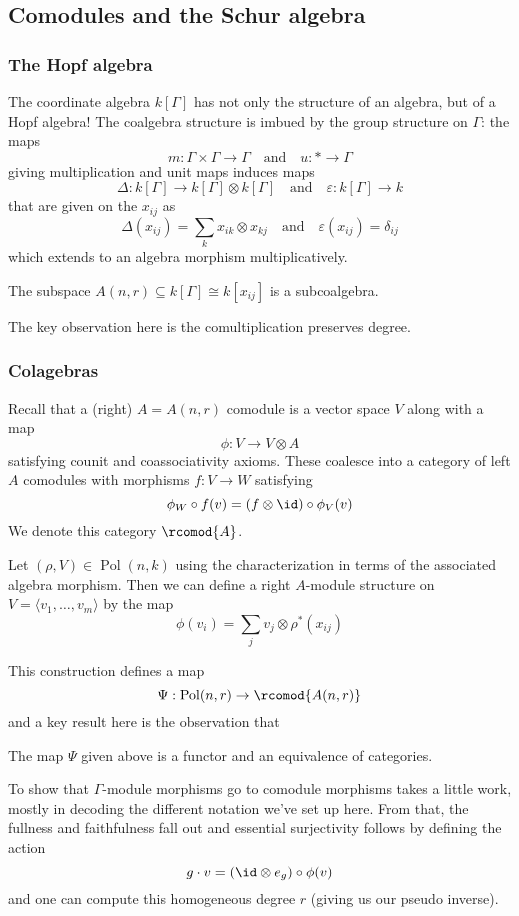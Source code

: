 \documentclass[12pt]{article}
\DeclareMathOperator{\Pol}{Pol}
\begin{document}
	\subsection{Comodules and the Schur algebra}
		\subsubsection{The Hopf algebra}
		The coordinate algebra $k[\Gamma]$ has not only the structure of an algebra, but of a Hopf algebra!
		The coalgebra structure is imbued by the group structure on $\Gamma$: the maps 
		\[m:\Gamma\times\Gamma\to \Gamma\quad\text{and}\quad u:\ast\to \Gamma\]
		giving multiplication and unit maps induces maps 
		\[\Delta:k[\Gamma]\to k[\Gamma]\otimes k[\Gamma]\quad\text{and}\quad \varepsilon:k[\Gamma]\to k\]
		that are given on the $x_{ij}$ as 
		\[\Delta(x_{ij})=\sum_k x_{ik}\otimes x_{kj}\quad\text{and}\quad \varepsilon(x_{ij})=\delta_{ij}\]
		which extends to an algebra morphism multiplicatively.

		\begin{thm}
			The subspace $A(n,r)\subseteq k[\Gamma]\cong k[x_{ij}]$ is a subcoalgebra.
		\end{thm}
		The key observation here is the comultiplication preserves degree.

		\subsubsection{Colagebras}
		Recall that a (right) $A=A(n,r)$ comodule is a vector space $V$ along with a map 
		\[\phi:V\to V\otimes A\]
		satisfying counit and coassociativity axioms. These coalesce into a category of left $A$ comodules with morphisms 
		$f:V\to W$ satisfying 
		\[\phi_W\circ f(v)=(f\otimes \id)\circ \phi_V(v)\]
		We denote this category $\rcomod{A}$.

		Let $(\rho,V)\in \Pol(n,k)$ using the characterization in terms of the associated algebra morphism. Then 
		we can define a right $A$-module structure on $V=\langle v_1,\dots,v_m\rangle$ by the map 
		\[\phi(v_i)=\sum_jv_j\otimes \rho^\ast(x_{ij})\] 
		
		This construction defines a map
		\[\Psi:\Pol(n,r)\to \rcomod{A(n,r)}\] 
		and a key result here is the observation that 
		\begin{thm}
			The map $\Psi$ given above is a functor and an equivalence of categories.
		\end{thm}
		\begin{rmk}
			To show that $\Gamma$-module morphisms go to comodule morphisms takes a little work, mostly in decoding 
			the different notation we've set up here. From that, the fullness and faithfulness fall out and essential surjectivity 
			follows by defining the action 
			\[g\cdot v =(\id\otimes e_g)\circ\phi(v)\]
			and one can compute this homogeneous degree $r$ (giving us our pseudo inverse).
		\end{rmk}
\end{document}
